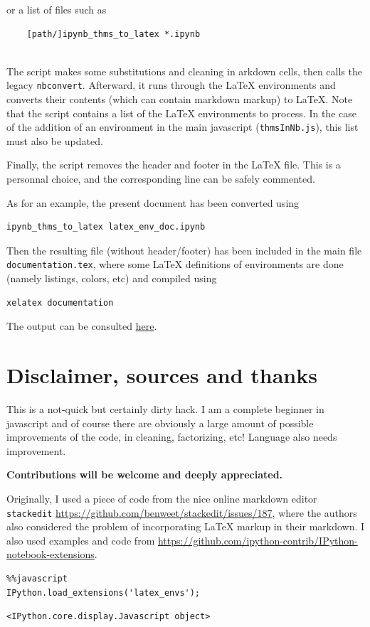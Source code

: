 or a list of files such as

\begin{verbatim}
    [path/]ipynb_thms_to_latex *.ipynb
    
\end{verbatim}

The script makes some substitutions and cleaning in arkdown cells, then
calls the legacy \texttt{nbconvert}. Afterward, it runs through the
LaTeX environments and converts their contents (which can contain
markdown markup) to LaTeX. Note that the script contains a list of the
LaTeX environments to process. In the case of the addition of an
environment in the main javascript (\texttt{thmsInNb.js}), this list
must also be updated.

Finally, the script removes the header and footer in the LaTeX file.
This is a personnal choice, and the corresponding line can be safely
commented.

\begin{example}
As for an example, the present document has been converted using

\begin{verbatim}
ipynb_thms_to_latex latex_env_doc.ipynb
\end{verbatim}

Then the resulting file (without header/footer) has been included in the
main file \texttt{documentation.tex}, where some LaTeX definitions of
environments are done (namely listings, colors, etc) and compiled using

\begin{verbatim}
xelatex documentation
\end{verbatim}

The output can be consulted \href{documentation.pdf}{here}.
\end{example}

    \section{Disclaimer, sources and
thanks}\label{disclaimer-sources-and-thanks}

    This is a not-quick but certainly dirty hack. I am a complete beginner
in javascript and of course there are obviously a large amount of
possible improvements of the code, in cleaning, factorizing, etc!
Language also needs improvement.

\textbf{Contributions will be welcome and deeply appreciated.}

Originally, I used a piece of code from the nice online markdown editor
\texttt{stackedit}
\url{https://github.com/benweet/stackedit/issues/187}, where the authors
also considered the problem of incorporating LaTeX markup in their
markdown. I also used examples and code from
\url{https://github.com/ipython-contrib/IPython-notebook-extensions}.
\begin{lstlisting}
%%javascript 
IPython.load_extensions('latex_envs');
\end{lstlisting}%
%
    
    \begin{verbatim}
<IPython.core.display.Javascript object>
    \end{verbatim}

    

    
    
%
%

    
    